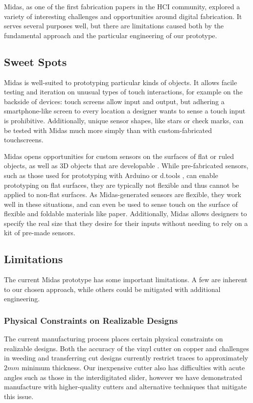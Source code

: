     Midas, as one of the first fabrication papers in the HCI community, explored a variety of interesting challenges and opportunities around digital fabrication. It serves several purposes well, but there are limitations caused both by the fundamental approach and the particular engineering of our prototype.

    \subsection{Sweet Spots}
    
    Midas is well-suited to prototyping particular kinds of objects. It allows facile testing and iteration on unusual types of touch interactions, for example on the backside of devices: touch screens allow input and output, but adhering a smartphone-like screen to every location a designer wants to sense a touch input is prohibitive. Additionally, unique sensor shapes, like stars or check marks, can be tested with Midas much more simply than with custom-fabricated touchscreens.
    
    Midas opens opportunities for custom sensors on the surfaces of flat or ruled objects, as well as 3D objects that are developable \cite{dutton-developable}. While pre-fabricated sensors, such as those used for prototyping with Arduino \cite{arduino} or d.tools \cite{hartmann-dtools}, can enable prototyping on flat surfaces, they are typically not flexible and thus cannot be applied to non-flat surfaces. As Midas-generated sensors are flexible, they work well in these situations, and can even be used to sense touch on the surface of flexible and foldable materials like paper. Additionally, Midas allows designers to specify the real size that they desire for their inputs without needing to rely on a kit of pre-made sensors.

    \subsection{Limitations}
    
    The current Midas prototype has some important limitations. A few are inherent to our chosen approach, while others could be mitigated with additional engineering.

\subsubsection{Physical Constraints on Realizable Designs}
The current manufacturing process places certain physical constraints on realizable designs. Both the accuracy of the vinyl cutter on copper and challenges in weeding and transferring cut designs currently restrict traces to approximately $2mm$ minimum thickness. Our inexpensive cutter also has difficulties with acute angles such as those in the interdigitated slider, however we have demonstrated manufacture with higher-quality cutters and alternative techniques that mitigate this issue.

